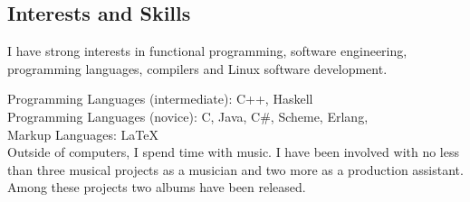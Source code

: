 \documentclass[margintitle,line]{res}
\begin{document}
\begin{resume}

\section{Interests and Skills}

I have strong interests in functional programming, software engineering, programming languages, compilers and Linux software development. 

Programming Languages (intermediate): C++, Haskell \\
Programming Languages (novice): C, Java, C\#, Scheme, Erlang, \\
Markup Languages: LaTeX \\

Outside of computers, I spend time with music. I have been involved with no less than three musical projects as a musician and two more as a production assistant. Among these projects two albums have been released. 






\end{resume}
\end{document}
